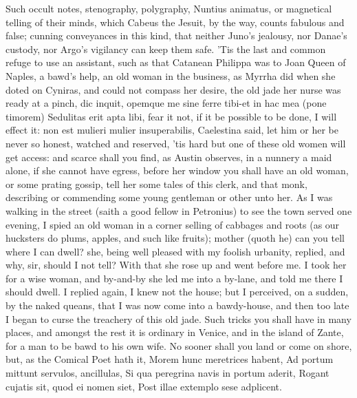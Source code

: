 {Such occult notes, stenography, polygraphy, Nuntius animatus, or
magnetical telling of their minds, which Cabeus the Jesuit, by
the way, counts fabulous and false; cunning conveyances in this kind,
that neither Juno's jealousy, nor Danae's custody, nor Argo's vigilancy
can keep them safe. 'Tis the last and common refuge to use an
assistant, such as that Catanean Philippa was to Joan Queen of Naples,
a bawd's help, an old woman in the business, as Myrrha did
when she doted on Cyniras, and could not compass her desire, the old
jade her nurse was ready at a pinch, dic inquit, opemque me sine ferre
tibi-et in hac mea (pone timorem) Sedulitas erit apta libi, fear it
not, if it be possible to be done, I will effect it: non est mulieri
mulier insuperabilis, Caelestina said, let him or her be never so
honest, watched and reserved, 'tis hard but one of these old women will
get access: and scarce shall you find, as Austin observes, in a
nunnery a maid alone, if she cannot have egress, before her window you
shall have an old woman, or some prating gossip, tell her some tales of
this clerk, and that monk, describing or commending some young
gentleman or other unto her. As I was walking in the street (saith a
good fellow in Petronius) to see the town served one evening, I
spied an old woman in a corner selling of cabbages and roots (as our
hucksters do plums, apples, and such like fruits); mother (quoth he)
can you tell where I can dwell? she, being well pleased with my foolish
urbanity, replied, and why, sir, should I not tell? With that she rose
up and went before me. I took her for a wise woman, and by-and-by she
led me into a by-lane, and told me there I should dwell. I replied
again, I knew not the house; but I perceived, on a sudden, by the naked
queans, that I was now come into a bawdy-house, and then too late I
began to curse the treachery of this old jade. Such tricks you shall
have in many places, and amongst the rest it is ordinary in Venice, and
in the island of Zante, for a man to be bawd to his own wife. No sooner
shall you land or come on shore, but, as the Comical Poet hath it,
Morem hunc meretrices habent,
Ad portum mittunt servulos, ancillulas,
Si qua peregrina navis in portum aderit,
Rogant cujatis sit, quod ei nomen siet,
Post illae extemplo sese adplicent.

}
